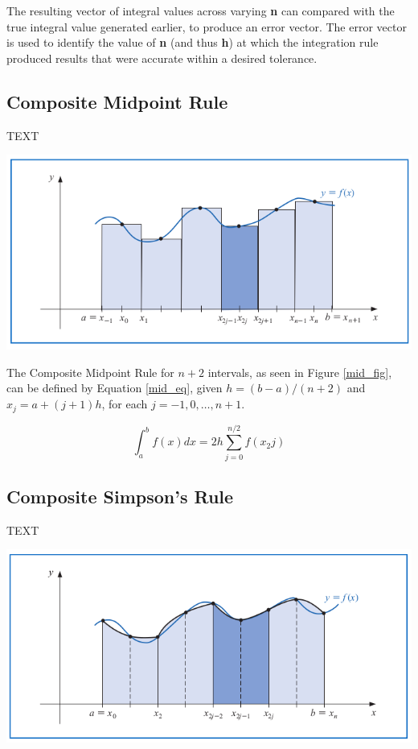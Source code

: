 \documentclass[a4paper]{article}
\begin{document}
 The resulting vector of integral values across varying \textbf{n} can compared with the true integral value generated earlier, to produce an error vector. The error vector is used to identify the value of \textbf{n} (and thus \textbf{h}) at which the integration rule produced results that were accurate within a desired tolerance.



\subsection{Composite Midpoint Rule}
TEXT

\begin{center}
	\includegraphics[width=1\textwidth]{../additional/midpoint_fig.png}
	\label{mid_fig}
\end{center}

The Composite Midpoint Rule for $n+2$ intervals, as seen in Figure \ref{mid_fig}, can be defined by Equation \ref{mid_eq}, given $h=(b-a)/(n+2)$ and $x_j=a+(j+1)h$, for each $j=-1,0,\dots,n+1$\cite{burden2010}.

\begin{equation}
\int_{a}^b f(x) dx = 2h \sum_{j=0}^{n/2}f(x_2j)
\label{mid_eq}
\end{equation}

\subsection{Composite Simpson's Rule}
TEXT

\begin{center}
	\includegraphics[width=1\textwidth]{../additional/simpsons_fig.png}
	\label{sim_fig}
\end{center}
\end{document}
